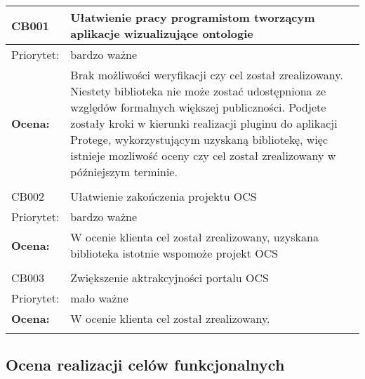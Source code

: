 \documentclass[a4paper,10pt]{article}
\begin{document}
\begin{center}
\begin{tabular}{|m{3cm}|m{9cm}|} \hline

CB001 & Ułatwienie pracy programistom tworzącym aplikacje wizualizujące ontologie  \\ \hline
Priorytet: & bardzo ważne \\ \hline
\textbf{Ocena:} & Brak możliwości weryfikacji czy cel został zrealizowany. Niestety biblioteka nie może zostać udostępniona ze względów formalnych większej publiczności. Podjete zostały kroki w kierunki realizacji pluginu do aplikacji Protege, wykorzystującym uzyskaną bibliotekę, więc istnieje mozliwość oceny czy cel został zrealizowany w późniejszym terminie.    \\ \hline

\multicolumn{2}{c}{} \\


 \hline
CB002 & Ułatwienie zakończenia projektu OCS   \\ \hline
Priorytet: & bardzo ważne \\ \hline
\textbf{Ocena:} & W ocenie klienta cel został zrealizowany, uzyskana biblioteka istotnie wspomoże projekt OCS \\ \hline
\multicolumn{2}{c}{} \\
 \hline
CB003 & Zwiększenie aktrakcyjności portalu OCS   \\ \hline
Priorytet: & mało ważne \\ \hline
\textbf{Ocena:} & W ocenie klienta cel został zrealizowany. \\ \hline
\multicolumn{2}{c}{} \\
\end{tabular}


\end{center}

\subsection{Ocena realizacji celów funkcjonalnych}
\end{document}
